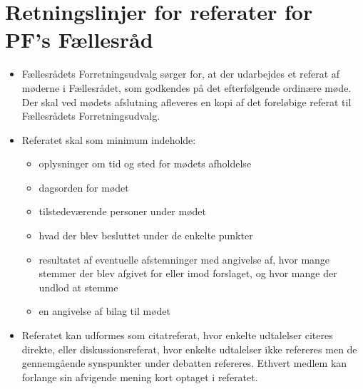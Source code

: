 \section{Retningslinjer for referater for PF's Fællesråd}
\label{RetningslinjerForRefFR}
\begin{itemize}
\item Fællesrådets Forretningsudvalg sørger for, at der udarbejdes et referat af møderne i Fællesrådet, som godkendes
        på det efterfølgende ordinære møde. Der skal ved mødets afslutning afleveres en kopi af det foreløbige referat
             til Fællesrådets Forretningsudvalg.
\item Referatet skal som minimum indeholde:
\begin{itemize}
\item oplysninger om tid og sted for mødets afholdelse
\item dagsorden for mødet
\item tilstedeværende personer under mødet
\item hvad der blev besluttet under de enkelte punkter
\item resultatet af eventuelle afstemninger med angivelse af, hvor mange stemmer der blev afgivet for eller imod forslaget, og hvor mange der undlod at stemme
\item en angivelse af bilag til mødet
\end{itemize}
\item Referatet kan udformes som citatreferat, hvor enkelte udtalelser citeres direkte, eller diskussionsreferat, hvor enkelte udtalelser ikke refereres men de gennemgående synspunkter under debatten refereres. Ethvert medlem kan forlange sin afvigende  mening kort optaget i referatet.

\end{itemize}